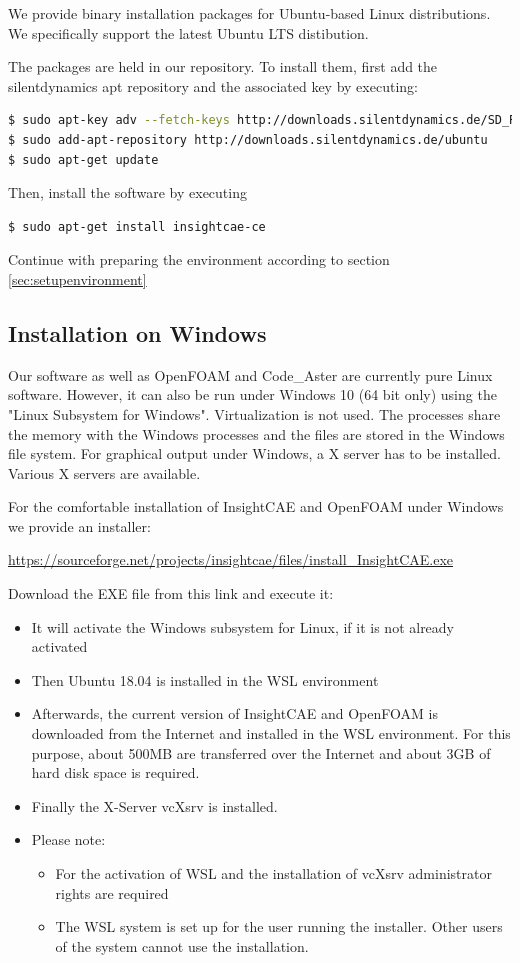 We provide binary installation packages for Ubuntu-based Linux distributions. We specifically support the latest Ubuntu LTS distibution.

The packages are held in our repository. To install them, first add the silentdynamics apt repository and the associated key by executing:

\begin{lstlisting}[language=bash]
$ sudo apt-key adv --fetch-keys http://downloads.silentdynamics.de/SD_REPOSITORIES_PUBLIC_KEY.gpg
$ sudo add-apt-repository http://downloads.silentdynamics.de/ubuntu
$ sudo apt-get update
\end{lstlisting}

Then, install the software by executing

\begin{lstlisting}[language=bash]
$ sudo apt-get install insightcae-ce
\end{lstlisting}

Continue with preparing the environment according to section \ref{sec:setupenvironment}

\subsection{Installation on Windows}
Our software as well as OpenFOAM and Code\_Aster are currently pure Linux software. 
However, it can also be run under Windows 10 (64 bit only) using the "Linux Subsystem for Windows".
Virtualization is not used. 
The processes share the memory with the Windows processes and the files are stored in the Windows file system. 
For graphical output under Windows, a X server has to be installed. 
Various X servers are available.

For the comfortable installation of InsightCAE and OpenFOAM under Windows we provide an installer:

\url{https://sourceforge.net/projects/insightcae/files/install_InsightCAE.exe}

Download the EXE file from this link and execute it:

\begin{itemize}
\item It will activate the Windows subsystem for Linux, if it is not already activated
\item Then Ubuntu 18.04 is installed in the WSL environment
\item Afterwards, the current version of InsightCAE and OpenFOAM is downloaded from the Internet and installed in the WSL environment. 
For this purpose, about 500MB are transferred over the Internet and about 3GB of hard disk space is required.
\item Finally the X-Server vcXsrv is installed.
\item Please note:
\begin{itemize}
\item For the activation of WSL and the installation of vcXsrv administrator rights are required
\item The WSL system is set up for the user running the installer. Other users of the system cannot use the installation.
\end{itemize}
\end{itemize}

